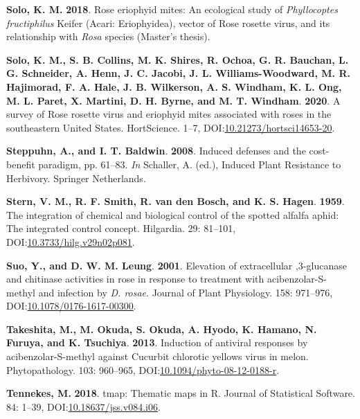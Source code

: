 \documentclass[12pt,final,CPage]{ufthesis}
\newlength{\cslhangindent}
\newenvironment{CSLReferences}[2] %
{%
	\setlength{\parindent}{0pt}
	\ifodd #1 \everypar{\setlength{\hangindent}{\cslhangindent}}\ignorespaces\fi
	\ifnum #2 > 0
	\setlength{\parskip}{#2\baselineskip}
	\fi
}%
{}
\begin{document}
{\begin{CSLReferences}{1}{0}
  \leavevmode{}%
  \textbf{Solo, K. M.} \textbf{2018}. Rose eriophyid mites: An ecological study of {\emph{Phyllocoptes fructiphilus}} {Keifer} {({Acari}: {Eriophyidea})}, vector of {Rose rosette virus}, and its relationship with {\emph{Rosa}} species (Master's thesis).

  \leavevmode{}%
  \textbf{Solo, K. M., S. B. Collins, M. K. Shires, R. Ochoa, G. R. Bauchan, L. G. Schneider, A. Henn, J. C. Jacobi, J. L. Williams-Woodward, M. R. Hajimorad, F. A. Hale, J. B. Wilkerson, A. S. Windham, K. L. Ong, M. L. Paret, X. Martini, D. H. Byrne, and M. T. Windham}. \textbf{2020}. A survey of {Rose rosette virus} and eriophyid mites associated with roses in the southeastern {United States}. {HortScience}. 1--7, DOI:\href{https://doi.org/10.21273/hortsci14653-20}{10.21273/hortsci14653-20}.

  \leavevmode{}%
  \textbf{Steppuhn, A., and I. T. Baldwin}. \textbf{2008}. Induced defenses and the cost-benefit paradigm, pp. 61--83. \emph{In} Schaller, A. (ed.), Induced Plant Resistance to Herbivory. Springer Netherlands.

  \leavevmode{}%
  \textbf{Stern, V. M., R. F. Smith, R. van den Bosch, and K. S. Hagen}. \textbf{1959}. The integration of chemical and biological control of the spotted alfalfa aphid: The integrated control concept. Hilgardia. 29: 81--101, DOI:\href{https://doi.org/10.3733/hilg.v29n02p081}{10.3733/hilg.v29n02p081}.

  \leavevmode{}%
  \textbf{Suo, Y., and D. W. M. Leung}. \textbf{2001}. Elevation of extracellular ,3-glucanase and chitinase activities in rose in response to treatment with acibenzolar-{S}-methyl and infection by {\emph{D. rosae}}. Journal of Plant Physiology. 158: 971--976, DOI:\href{https://doi.org/10.1078/0176-1617-00300}{10.1078/0176-1617-00300}.

  \leavevmode{}%
  \textbf{Takeshita, M., M. Okuda, S. Okuda, A. Hyodo, K. Hamano, N. Furuya, and K. Tsuchiya}. \textbf{2013}. Induction of antiviral responses by acibenzolar-{S}-methyl against {Cucurbit chlorotic yellows virus} in melon. Phytopathology{\textregistered}. 103: 960--965, DOI:\href{https://doi.org/10.1094/phyto-08-12-0188-r}{10.1094/phyto-08-12-0188-r}.

  \leavevmode{}%
  \textbf{Tennekes, M.} \textbf{2018}. {tmap}: Thematic maps in {R}. Journal of Statistical Software. 84: 1--39, DOI:\href{https://doi.org/10.18637/jss.v084.i06}{10.18637/jss.v084.i06}.


\end{CSLReferences}}
\end{document}
